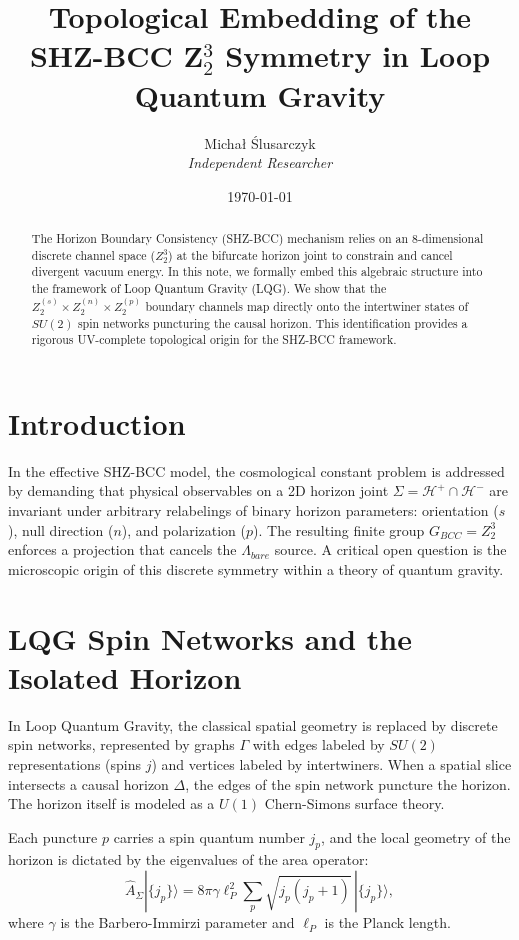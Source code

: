 \documentclass[11pt,a4paper]{article}
\title{\textbf{Topological Embedding of the SHZ-BCC Z$_2^3$ Symmetry in Loop Quantum Gravity}}
\author{Micha\l{} \'Slusarczyk \\ \small{\textit{Independent Researcher}}}
\date{\today}
\begin{document}
\maketitle

\begin{abstract}
The Horizon Boundary Consistency (SHZ-BCC) mechanism relies on an $8$-dimensional discrete channel space ($Z_2^3$) at the bifurcate horizon joint to constrain and cancel divergent vacuum energy. In this note, we formally embed this algebraic structure into the framework of Loop Quantum Gravity (LQG). We show that the $Z_2^{(s)} \times Z_2^{(n)} \times Z_2^{(p)}$ boundary channels map directly onto the intertwiner states of $SU(2)$ spin networks puncturing the causal horizon. This identification provides a rigorous UV-complete topological origin for the SHZ-BCC framework.
\end{abstract}

\section{Introduction}
In the effective SHZ-BCC model, the cosmological constant problem is addressed by demanding that physical observables on a 2D horizon joint $\Sigma = \mathcal{H}^+ \cap \mathcal{H}^-$ are invariant under arbitrary relabelings of binary horizon parameters: orientation ($s$), null direction ($n$), and polarization ($p$). The resulting finite group $G_{BCC} = Z_2^3$ enforces a projection that cancels the $\Lambda_{bare}$ source. A critical open question is the microscopic origin of this discrete symmetry within a theory of quantum gravity. 

\section{LQG Spin Networks and the Isolated Horizon}
In Loop Quantum Gravity, the classical spatial geometry is replaced by discrete spin networks, represented by graphs $\Gamma$ with edges labeled by $SU(2)$ representations (spins $j$) and vertices labeled by intertwiners. When a spatial slice intersects a causal horizon $\Delta$, the edges of the spin network puncture the horizon. The horizon itself is modeled as a $U(1)$ Chern-Simons surface theory.

Each puncture $p$ carries a spin quantum number $j_p$, and the local geometry of the horizon is dictated by the eigenvalues of the area operator:
\begin{equation}
    \hat{A}_{\Sigma} | \{j_p\} \rangle = 8\pi \gamma \ell_P^2 \sum_p \sqrt{j_p(j_p+1)} \, | \{j_p\} \rangle,
\end{equation}
where $\gamma$ is the Barbero-Immirzi parameter and $\ell_P$ is the Planck length.
\end{document}
